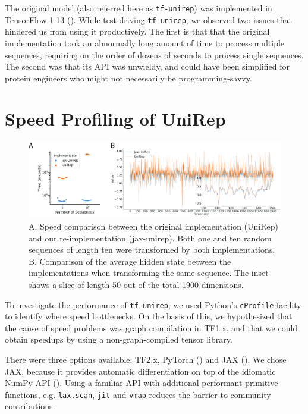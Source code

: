 \documentclass{bioinfo}
\begin{document}
The original model (also referred here as \verb|tf-unirep|)
was implemented in TensorFlow 1.13 (\cite{abadi2016tensorflow}).
While test-driving \verb|tf-unirep|, we observed two issues
that hindered us from using it productively.
The first is that that the original implementation
took an abnormally long amount of time to process multiple sequences,
requiring on the order of dozens of seconds to process single sequences.
The second was that its API was unwieldy,
and could have been simplified for protein engineers
who might not necessarily be programming-savvy.

\section{Speed Profiling of UniRep}

\begin{figure}[!tpb]
    \centerline{\includegraphics[width=6in]{fig01.jpg}}
    \caption{
        A. Speed comparison between the original implementation (UniRep)
        and our re-implementation (jax-unirep).
        Both one and ten random sequences of length ten
        were transformed by both implementations.
        B. Comparison of the average hidden state between the implementations
        when transforming the same sequence.
        The inset shows a slice of length 50 out of the total 1900 dimensions.
    }
    \label{fig:01}
\end{figure}

To investigate the performance of \verb|tf-unirep|,
we used Python's \verb|cProfile| facility to identify
where speed bottlenecks.
On the basis of this, we hypothesized that the cause of speed problems
was graph compilation in TF1.x,
and that we could obtain speedups by using a non-graph-compiled tensor library.

There were three options available: TF2.x, PyTorch (\cite{pytorch})
and JAX (\cite{jax2018github}).
We chose JAX, because it provides automatic differentiation
on top of the idiomatic NumPy API (\cite{oliphant2006guide}).
Using a familiar API with additional performant primitive functions,
e.g. \verb|lax.scan|, \verb|jit| and \verb|vmap|
reduces the barrier to community contributions.
\end{document}
